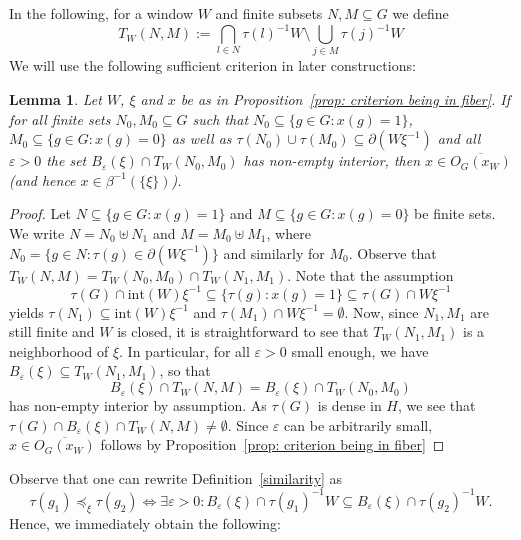 \documentclass[titlepage,reqno,10pt]{amsart}
\newtheorem{lemma}[theorem]{Lemma}
\theoremstyle{definition}
\newcommand{\tm}{\subseteq}
\newcommand{\ol}[1]{\overline{#1}}
\begin{document}
In the following, for a window $W$ and finite subsets $N,M\tm G$ we define
$$ T_W(N,M) :=\bigcap_{l\in N} {\tau(l)}^{-1}W \setminus \bigcup_{j\in M}  \tau(j)^{-1}W $$
We will use the following sufficient criterion in later constructions:
\begin{lemma}\label{lem: suff crit being in fiber}
    Let $W$, $\xi$ and $x$ be as in Proposition~\ref{prop: criterion being in fiber}.
    If for all finite sets $N_0,M_0\tm G$ such that $N_0\tm\{g\in G: x(g) = 1\}$, $M_0\tm \{g\in G:x(g)=0\}$ as well as $\tau(N_0)\cup\tau(M_0)\tm \partial(W\xi^{-1})$ and all $\varepsilon>0$ the set $B_{\varepsilon}(\xi)\cap T_W(N_0,M_0)$ has non-empty interior, then $x\in \ol{O_G(x_W)}$ (and hence $x\in \beta^{-1}(\{\xi\})$).
\end{lemma}
\begin{proof}
    Let $N\tm \{g\in G : x(g)=1\}$ and $M\tm \{g\in G: x(g)=0\}$ be finite sets.
    We write $N = N_0\uplus N_1$ and $M = M_0\uplus M_1$, where $N_0 = \{g\in N: \tau(g) \in \partial(W\xi^{-1})\}$ and similarly for $M_0$.
    Observe that $T_W(N,M) = T_W(N_0,M_0)\cap T_W(N_1,M_1)$.
    Note that the assumption
    $$\tau(G)\cap \mathrm{int}(W)\xi^{-1}\subseteq \{\tau(g):x(g)=1\}\subseteq \tau(G)\cap W\xi^{-1}$$
    yields $\tau(N_1)\tm \mathrm{int}(W)\xi^{-1}$ and $\tau(M_1)\cap W\xi^{-1} = \emptyset$.
    Now, since $N_1,M_1$ are still finite and $W$ is closed, it is straightforward to see that $T_W(N_1,M_1)$ is a neighborhood of $\xi$.
    In particular, for all $\varepsilon>0$ small enough, we have $B_\varepsilon(\xi)\tm T_W(N_1,M_1)$, so that 
    $$ B_\varepsilon(\xi)\cap T_W(N,M) = B_{\varepsilon}(\xi)\cap T_W(N_0,M_0)$$
    has non-empty interior by assumption.
    As $\tau(G)$ is dense in $H$, we see that $\tau(G) \cap B_\varepsilon(\xi)\cap T_W(N,M) \neq \emptyset$.
    Since $\varepsilon$ can be arbitrarily small, $x\in \ol{O_G(x_W)}$ follows by Proposition~\ref{prop: criterion being in fiber}
\end{proof}

Observe that one can rewrite Definition~\ref{similarity} as
$$ \tau(g_1)\preccurlyeq_\xi \tau(g_2)\iff \exists\varepsilon>0: B_{\varepsilon}(\xi)\cap \tau(g_1)^{-1}W \tm B_{\varepsilon}(\xi) \cap \tau(g_2)^{-1}W.$$
Hence, we immediately obtain the following:
\end{document}
